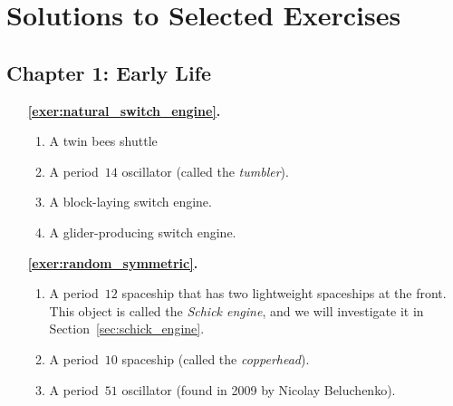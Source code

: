 \chapter{Solutions to Selected Exercises}\label{chp:solutions}
\setlength{\columnsep}{4.2em}
\footnotesize

\hypertarget{solutions_early_life}{}\label{solutions_early_life}
\section*{Chapter 1: Early Life}
\renewcommand{\chapterfolder}{early_life/}

\begin{multicols}{2}
	\begin{itemize}[leftmargin=0em]
		\item[\bf\color{ocre}\sffamily\ref{exer:natural_switch_engine}.] \begin{enumerate}[leftmargin=1.5em,label=\bf\color{ocre}(\alph*)]
			\item A twin bees shuttle
			
			\item A period~$14$ oscillator (called the \emph{tumbler}).
			
			\item A block-laying switch engine.
			
			\item A glider-producing switch engine. \\
		\end{enumerate}
		
		
		\item[\bf\color{ocre}\sffamily\ref{exer:random_symmetric}.] \begin{enumerate}[leftmargin=1.5em,label=\bf\color{ocre}(\alph*)]
			\item A period~$12$ spaceship that has two lightweight spaceships at the front. This object is called the \emph{Schick engine}, and we will investigate it in Section~\ref{sec:schick_engine}.
			
			\item A period~$10$ spaceship (called the \emph{copperhead}).
			
			\item A period~$51$ oscillator (found in 2009 by Nicolay Beluchenko).
			

\end{enumerate}
\end{itemize}
\end{multicols}
